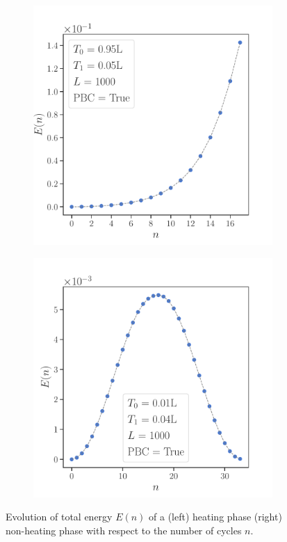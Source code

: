 \documentclass[11pt, a4paper]{article}
\theoremstyle{definition} %
\begin{document}
\begin{figure}[h]
\centering
\begin{subfigure}[t]{0.49\textwidth}
	\centering
	\includegraphics[width =\textwidth]{TotalEnergyHeating}\end{subfigure}
\begin{subfigure}[t]{0.49\textwidth}
	\centering
	\includegraphics[width =\textwidth]{TotalEnergyNonHeating}
\end{subfigure}
\caption{Evolution of total energy $E(n)$ of a (left) heating phase (right) non-heating phase with respect to the number of cycles $n$.}
\end{figure}
\end{document}
